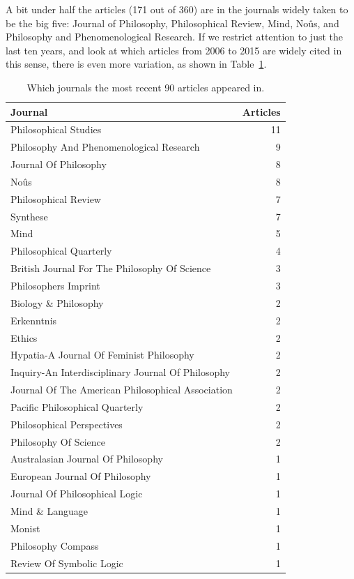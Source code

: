 \documentclass[
  10pt,
  letterpaper,
  DIV=11,
  numbers=noendperiod,
  twoside]{scrartcl}
\begin{document}
A bit under half the articles (171 out of 360) are in the journals
widely taken to be the big five: Journal of Philosophy, Philosophical
Review, Mind, Noûs, and Philosophy and Phenomenological Research. If we
restrict attention to just the last ten years, and look at which
articles from 2006 to 2015 are widely cited in this sense, there is even
more variation, as shown in Table~\ref{tbl-recent-journals-in-main-bib}.

\begin{longtable}[]{@{}lr@{}}

\caption{\label{tbl-recent-journals-in-main-bib}Which journals the most
recent 90 articles appeared in.}

\tabularnewline

\toprule\noalign{}
Journal & Articles \\
\midrule\noalign{}
\endhead
\bottomrule\noalign{}
\endlastfoot
Philosophical Studies & 11 \\
Philosophy And Phenomenological Research & 9 \\
Journal Of Philosophy & 8 \\
Noûs & 8 \\
Philosophical Review & 7 \\
Synthese & 7 \\
Mind & 5 \\
Philosophical Quarterly & 4 \\
British Journal For The Philosophy Of Science & 3 \\
Philosophers Imprint & 3 \\
Biology \& Philosophy & 2 \\
Erkenntnis & 2 \\
Ethics & 2 \\
Hypatia-A Journal Of Feminist Philosophy & 2 \\
Inquiry-An Interdisciplinary Journal Of Philosophy & 2 \\
Journal Of The American Philosophical Association & 2 \\
Pacific Philosophical Quarterly & 2 \\
Philosophical Perspectives & 2 \\
Philosophy Of Science & 2 \\
Australasian Journal Of Philosophy & 1 \\
European Journal Of Philosophy & 1 \\
Journal Of Philosophical Logic & 1 \\
Mind \& Language & 1 \\
Monist & 1 \\
Philosophy Compass & 1 \\
Review Of Symbolic Logic & 1 \\

\end{longtable}
\end{document}
